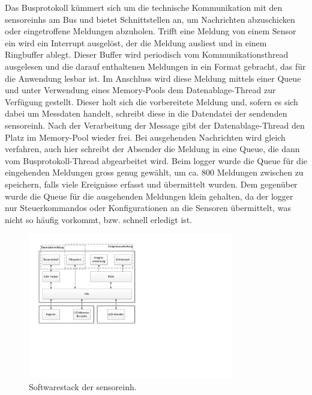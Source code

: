Das Busprotokoll kümmert sich um die technische Kommunikation mit den \glspl{sensoreinh} am Bus und bietet Schnittstellen an, um Nachrichten abzuschicken oder eingetroffene Meldungen abzuholen. Trifft eine Meldung von einem Sensor ein wird ein Interrupt ausgelöst, der die Meldung ausliest und in einem Ringbuffer ablegt. Dieser Buffer wird periodisch vom Kommunikationsthread ausgelesen und die darauf enthaltenen Meldungen in ein Format gebracht, das für die Anwendung lesbar ist. Im Anschluss wird diese Meldung mittels einer Queue und unter Verwendung eines Memory-Pools dem Datenablage-Thread zur Verfügung gestellt. Dieser holt sich die vorbereitete Meldung und, sofern es sich dabei um Messdaten handelt, schreibt diese in die Datendatei der sendenden \gls{sensoreinh}. Nach der Verarbeitung der Message gibt der Datenablage-Thread den Platz im Memory-Pool wieder frei. Bei ausgehenden Nachrichten wird gleich verfahren, auch hier schreibt der Absender die Meldung in eine Queue, die dann vom Busprotokoll-Thread abgearbeitet wird. Beim \gls{logger} wurde die Queue für die eingehenden Meldungen gross genug gewählt, um ca. 800 Meldungen zwischen zu speichern, falls viele Ereignisse erfasst und übermittelt wurden. Dem gegenüber wurde die Queue für die ausgehenden Meldungen klein gehalten, da der \gls{logger} nur Steuerkommandos oder Konfigurationen an die Sensoren übermittelt, was nicht so häufig vorkommt, bzw. schnell erledigt ist.

\begin{figure}
	\centering
		\includegraphics[width=0.8\textwidth]{images/visio/Softwarestack_Sensor.pdf}
	\caption{Softwarestack der \gls{sensoreinh}.}
	\label{fig.swsensor}
\end{figure}

